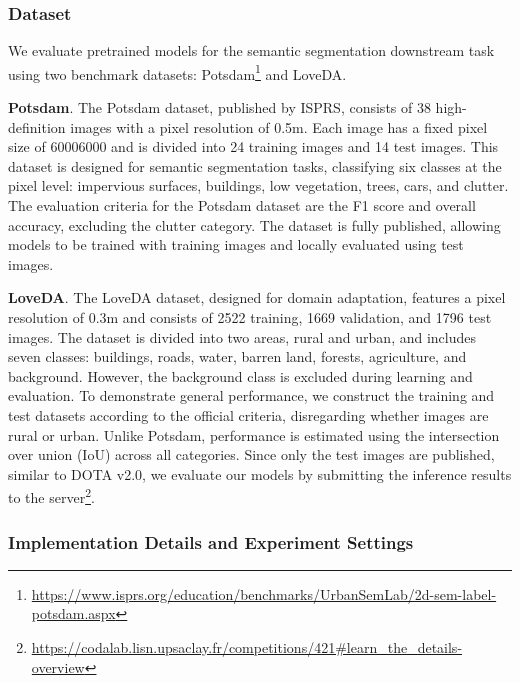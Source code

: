 \subsubsection{Dataset}
We evaluate pretrained models for the semantic segmentation downstream task using two benchmark datasets: Potsdam\footnote{\url{https://www.isprs.org/education/benchmarks/UrbanSemLab/2d-sem-label-potsdam.aspx}} and LoveDA.

\textbf{Potsdam}. The Potsdam dataset, published by ISPRS, consists of 38 high-definition images with a pixel resolution of 0.5m. Each image has a fixed pixel size of 60006000 and is divided into 24 training images and 14 test images. This dataset is designed for semantic segmentation tasks, classifying six classes at the pixel level: impervious surfaces, buildings, low vegetation, trees, cars, and clutter. The evaluation criteria for the Potsdam dataset are the F1 score and overall accuracy, excluding the clutter category. The dataset is fully published, allowing models to be trained with training images and locally evaluated using test images.

\textbf{LoveDA}. The LoveDA dataset, designed for domain adaptation, features a pixel resolution of 0.3m and consists of 2522 training, 1669 validation, and 1796 test images. The dataset is divided into two areas, rural and urban, and includes seven classes: buildings, roads, water, barren land, forests, agriculture, and background. However, the background class is excluded during learning and evaluation. To demonstrate general performance, we construct the training and test datasets according to the official criteria, disregarding whether images are rural or urban. Unlike Potsdam, performance is estimated using the intersection over union (IoU) across all categories. Since only the test images are published, similar to DOTA v2.0, we evaluate our models by submitting the inference results to the server\footnote{\url{https://codalab.lisn.upsaclay.fr/competitions/421\#learn_the_details-overview}}.

\subsubsection{Implementation Details and Experiment Settings}

